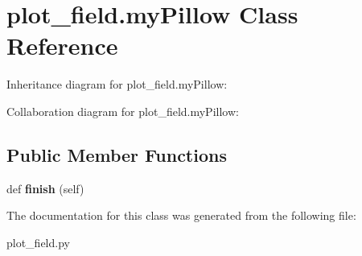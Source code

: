 \hypertarget{classplot__field_1_1myPillow}{}\section{plot\+\_\+field.\+my\+Pillow Class Reference}
\label{classplot__field_1_1myPillow}


Inheritance diagram for plot\+\_\+field.\+my\+Pillow\+:


Collaboration diagram for plot\+\_\+field.\+my\+Pillow\+:
\subsection*{Public Member Functions}
\begin{DoxyCompactItemize}
\item 
\mbox{\label{classplot__field_1_1myPillow_a6086bfe06dd983de89eae7511da2db97}} 
def {\bfseries finish} (self)
\end{DoxyCompactItemize}


The documentation for this class was generated from the following file\+:\begin{DoxyCompactItemize}
\item 
plot\+\_\+field.\+py\end{DoxyCompactItemize}
